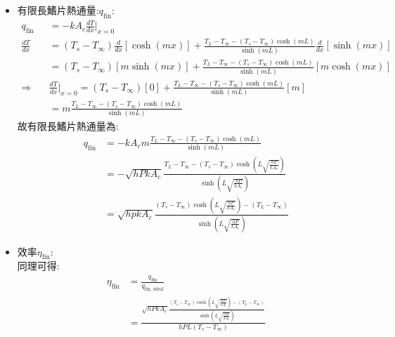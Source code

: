 \documentclass[../main.tex]{subfiles}
\begin{document}
\begin{itemize}
\begin{itemize}
\begin{itemize}
\begin{align}
      &\quad \quad + \frac{T_L - T_\infty - (T_s - T_\infty) 
      \cosh\left(L\sqrt{\frac{hP}{kA_c}}\right)}{\sinh\left(L\sqrt{\frac{hP}{kA_c}}\right)} 
      \sinh\left(\sqrt{\frac{hP}{kA_c}}x\right) \label{eq:heat_transfer_fin_finite_knownT_temperature_distribution}
    \end{align}
    \item 有限長鰭片熱通量:$q_\text{fin}$:
      \begin{align}
        q_\text{fin} &= -kA_c \frac{dT}{dx}\bigg|_{x=0} \nonumber\\
        \frac{dT}{dx} &= (T_s - T_\infty) \frac{d}{dx}\left[
          \cosh(mx)
        \right] + \frac{T_L - T_\infty - (T_s - T_\infty) \cosh(mL)}{\sinh(mL)} \frac{d}{dx}\left[
          \sinh(mx)
        \right] \nonumber\\
        &= (T_s - T_\infty) \left[
          m \sinh(mx)
        \right] + \frac{T_L - T_\infty - (T_s - T_\infty) \cosh(mL)}{\sinh(mL)} \left[
          m \cosh(mx)
        \right] \nonumber\\
        \Rightarrow\quad& \frac{dT}{dx}\bigg|_{x=0} = (T_s - T_\infty) \left[
          0
        \right] + \frac{T_L - T_\infty - (T_s - T_\infty) \cosh(mL)}{\sinh(mL)} \left[
          m
        \right] \nonumber\\
        &= m \frac{T_L - T_\infty - (T_s - T_\infty) \cosh(mL)}{\sinh(mL)}
      \end{align}
      故有限長鰭片熱通量為:
      \begin{align}
        q_\text{fin} &= -kA_c m \frac{T_L - T_\infty - (T_s - T_\infty) \cosh(mL)}{\sinh(mL)} \nonumber\\
        &= -\sqrt{hPkA_c} \frac{T_L - T_\infty - (T_s - T_\infty) \cosh\left(L\sqrt{\frac{hP}{kA_c}}\right)}{\sinh\left(L\sqrt{\frac{hP}{kA_c}}\right)}  \nonumber\\
        &= \boxed{\sqrt{hpkA_c}\frac{(T_s - T_\infty) \cosh\left(L\sqrt{\frac{hP}{kA_c}}\right) - (T_L - T_\infty)}
        {\sinh\left(L\sqrt{\frac{hP}{kA_c}}\right)} }
      \end{align}
    \item 效率$\eta_\text{fin}$:\\
      同理可得:
      \begin{align}
        \eta_\text{fin} &= \frac{q_\text{fin}}{q_{\text{fin, ideal}}} \nonumber\\
        &= \frac{\sqrt{hPkA_c}\frac{(T_s - T_\infty) \cosh\left(L\sqrt{\frac{hP}{kA_c}}\right) - (T_L - T_\infty)}
        {\sinh\left(L\sqrt{\frac{hP}{kA_c}}\right)} }{h P L (T_s - T_\infty)} \nonumber\\

\end{align}
\end{itemize}
\end{itemize}
\end{itemize}
\end{document}
